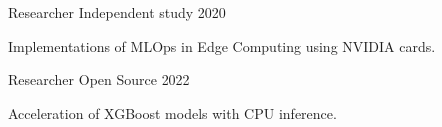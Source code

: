 

\begin{cventries}

  \cventry
    {Researcher} %
    {Independent study} %
    {} %
    {2020} %
    {
      \begin{cvitems} %
        \item {Implementations of MLOps in Edge Computing using NVIDIA cards.}
      \end{cvitems}
    }

  \cventry
    {Researcher} %
    {Open Source} %
    {} %
    {2022} %
    {
      \begin{cvitems} %
        \item {Acceleration of XGBoost models with CPU inference.}
      \end{cvitems}
    }

\end{cventries}
